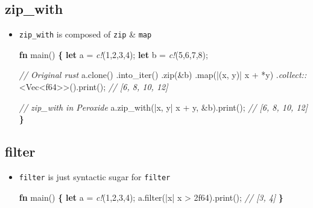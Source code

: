 \documentclass[]{book}
\newenvironment{Shaded}{\begin{snugshade}}{\end{snugshade}}
\newcommand{\CommentTok}[1]{\textcolor[rgb]{0.56,0.35,0.01}{\textit{#1}}}
\newcommand{\DataTypeTok}[1]{\textcolor[rgb]{0.13,0.29,0.53}{#1}}
\newcommand{\DecValTok}[1]{\textcolor[rgb]{0.00,0.00,0.81}{#1}}
\newcommand{\KeywordTok}[1]{\textcolor[rgb]{0.13,0.29,0.53}{\textbf{#1}}}
\newcommand{\NormalTok}[1]{#1}
\newcommand{\OperatorTok}[1]{\textcolor[rgb]{0.81,0.36,0.00}{\textbf{#1}}}
\newcommand{\PreprocessorTok}[1]{\textcolor[rgb]{0.56,0.35,0.01}{\textit{#1}}}
\begin{document}
\hypertarget{zip_with}{%
\subsection{zip\_with}\label{zip_with}}

\begin{itemize}
\item
  \texttt{zip\_with} is composed of \texttt{zip} \& \texttt{map}

\begin{Shaded}
\begin{Highlighting}[]
\KeywordTok{fn}\NormalTok{ main() }\OperatorTok{\{}
    \KeywordTok{let}\NormalTok{ a = }\PreprocessorTok{c!}\NormalTok{(}\DecValTok{1}\NormalTok{,}\DecValTok{2}\NormalTok{,}\DecValTok{3}\NormalTok{,}\DecValTok{4}\NormalTok{);}
    \KeywordTok{let}\NormalTok{ b = }\PreprocessorTok{c!}\NormalTok{(}\DecValTok{5}\NormalTok{,}\DecValTok{6}\NormalTok{,}\DecValTok{7}\NormalTok{,}\DecValTok{8}\NormalTok{);}

    \CommentTok{// Original rust}
\NormalTok{    a.clone()}
\NormalTok{        .into_iter()}
\NormalTok{        .zip(&b)}
\NormalTok{        .map(|(x, y)| x + *y)}
\NormalTok{        .}\PreprocessorTok{collect::}\NormalTok{<}\DataTypeTok{Vec}\NormalTok{<}\DataTypeTok{f64}\NormalTok{>>().print();}
        \CommentTok{// [6, 8, 10, 12]}

    \CommentTok{// zip_with in Peroxide}
\NormalTok{    a.zip_with(|x, y| x + y, &b).print();}
    \CommentTok{// [6, 8, 10, 12]}
\OperatorTok{\}}
\end{Highlighting}
\end{Shaded}
\end{itemize}

\hypertarget{filter}{%
\subsection{filter}\label{filter}}

\begin{itemize}
\item
  \texttt{filter} is just syntactic sugar for \texttt{filter}

\begin{Shaded}
\begin{Highlighting}[]
\KeywordTok{fn}\NormalTok{ main() }\OperatorTok{\{}
    \KeywordTok{let}\NormalTok{ a = }\PreprocessorTok{c!}\NormalTok{(}\DecValTok{1}\NormalTok{,}\DecValTok{2}\NormalTok{,}\DecValTok{3}\NormalTok{,}\DecValTok{4}\NormalTok{);}
\NormalTok{    a.filter(|x| x > }\DecValTok{2f64}\NormalTok{).print();}
    \CommentTok{// [3, 4]}
\OperatorTok{\}}
\end{Highlighting}
\end{Shaded}
\end{itemize}
\end{document}
